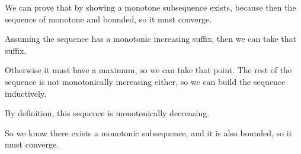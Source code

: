 \documentclass{article}
\begin{document}
We can prove that by showing a monotone subsequence exists, because then the sequence of monotone and bounded, so it must converge.

Assuming the sequence has a monotonic increasing suffix, then we can take that suffix.

Otherwise it must have a maximum, so we can take that point. The rest of the sequence is not monotonically increasing either, so we can build the sequence inductively.

By definition, this sequence is monotonically decreasing. 

So we know there exists a monotonic subsequence, and it is also bounded, so it must converge.
\end{document}
